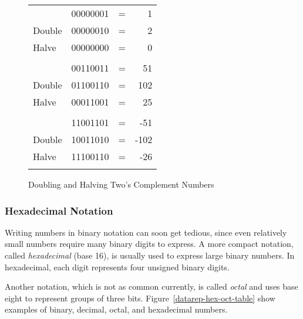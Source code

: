 \begin{figure}
\caption{ Doubling and Halving Two's Complement Numbers }
\begin{center}
\begin{tabular}{llcr}
\\
                & 00000001      & = & 1 \\
Double          & 00000010      & = & 2 \\
Halve		& 00000000      & = & 0 \\
\\
                & 00110011      & = & 51 \\
Double          & 01100110      & = & 102 \\
Halve           & 00011001      & = & 25 \\
\\
                & 11001101      & = & -51 \\
Double          & 10011010      & = & -102 \\
Halve           & 11100110      & = & -26 \\
\\
\end{tabular}
\end{center}
\end{figure}

\subsubsection{Hexadecimal Notation}

Writing numbers in binary notation can soon get tedious,
since even relatively small numbers require many
binary digits to express.  A more compact notation, called {\em hexadecimal}
(base 16), is usually used to express large binary numbers.
In hexadecimal, each digit represents four unsigned binary digits.

Another notation, which is not as common currently, is called {\em octal}
and uses base eight to represent groups of three bits.
Figure~\ref{datarep-hex-oct-table} show examples of binary, decimal, octal, and
hexadecimal numbers.

